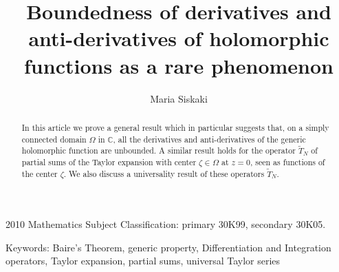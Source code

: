 \documentclass[11pt,twoside,a4paper]{article}
\title{Boundedness of derivatives and anti-derivatives of holomorphic functions as a rare phenomenon}
\author{Maria Siskaki}
\date{}
\theoremstyle{remark}
\newcommand{\ttn}{\widetilde{T}_N}
\begin{document}
\maketitle

\begin{abstract}
  In this article we prove a general result which in particular suggests that, on a simply connected domain $\Omega$ in $\mathbb{C}$, all the derivatives and anti-derivatives of the generic holomorphic function are unbounded. A similar result holds for the operator $\ttn$ of partial sums of the Taylor expansion with center $\zeta \in \Omega$ at $z=0$, seen as functions of the center $\zeta$. We also discuss a universality result of these operators $\ttn$.
\end{abstract}
\vspace{5pt}
\begin{flushleft} 2010 Mathematics Subject Classification: primary 30K99, secondary 30K05.
  \end{flushleft}
\vspace{5pt}
\begin{flushleft}
  Keywords: Baire's Theorem, generic property, Differentiation and Integration operators, Taylor expansion, partial sums, universal Taylor series
\end{flushleft}
\end{document}
